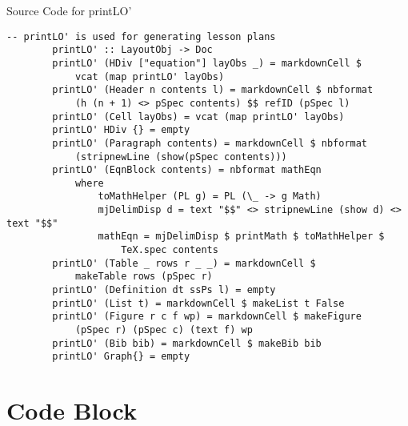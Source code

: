 \begin{listing}[h!]
	\caption{Source Code for printLO'}
	\label{code:printLO'}
	\begin{lstlisting}[language=haskell1, basicstyle=\small\ttfamily]
		-- printLO' is used for generating lesson plans
		printLO' :: LayoutObj -> Doc
		printLO' (HDiv ["equation"] layObs _) = markdownCell $ 
			vcat (map printLO' layObs)
		printLO' (Header n contents l) = markdownCell $ nbformat 
			(h (n + 1) <> pSpec contents) $$ refID (pSpec l)
		printLO' (Cell layObs) = vcat (map printLO' layObs)
		printLO' HDiv {} = empty
		printLO' (Paragraph contents) = markdownCell $ nbformat 
			(stripnewLine (show(pSpec contents)))
		printLO' (EqnBlock contents) = nbformat mathEqn
			where
				toMathHelper (PL g) = PL (\_ -> g Math)
				mjDelimDisp d = text "$$" <> stripnewLine (show d) <> text "$$" 
				mathEqn = mjDelimDisp $ printMath $ toMathHelper $ 
					TeX.spec contents
		printLO' (Table _ rows r _ _) = markdownCell $ 
			makeTable rows (pSpec r)
		printLO' (Definition dt ssPs l) = empty
		printLO' (List t) = markdownCell $ makeList t False
		printLO' (Figure r c f wp) = markdownCell $ makeFigure 
			(pSpec r) (pSpec c) (text f) wp
		printLO' (Bib bib) = markdownCell $ makeBib bib
		printLO' Graph{} = empty
	\end{lstlisting}
\end{listing}

\section{Code Block}